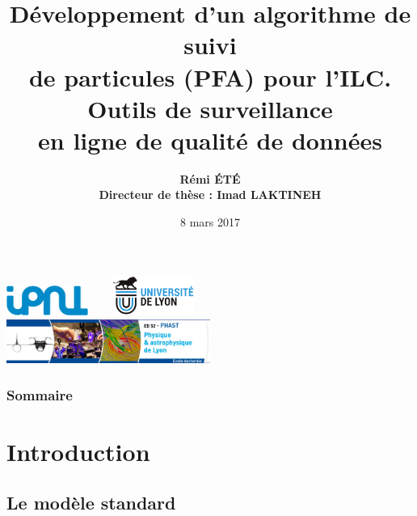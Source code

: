 \documentclass[8pt]{beamer}
\title[Séminaire 2ieme année]{Développement d'un algorithme de suivi \\ de particules (PFA) pour l'ILC. Outils de surveillance \\ en ligne de qualité de données}
\institute{\normalsize Institut de Physique Nucléaire de Lyon}
\author[R. Eté]{{\large \bf Rémi \'ET\'E} \\ {\bf Directeur de thèse : Imad LAKTINEH}}
\date{8 mars 2017}
\begin{document}
  \begin{frame}
    \titlepage
    \begin{center}
      \includegraphics[width=0.2\textwidth]{logo/logo_ipnl.jpg} ~~~
      \includegraphics[width=0.2\textwidth]{logo/logo-univ-lyon.png} ~~~
      \includegraphics[width=0.5\textwidth]{logo/logo-edphast.jpg}
    \end{center}
  \end{frame}


  \begin{frame}
  \frametitle{Sommaire}
    \tableofcontents
  \end{frame}


  \section{Introduction}

  \begin{frame}
  \frametitle{\secname}
    \tableofcontents[currentsection]
  \end{frame}

  \subsection{Le modèle standard}
\end{document}

